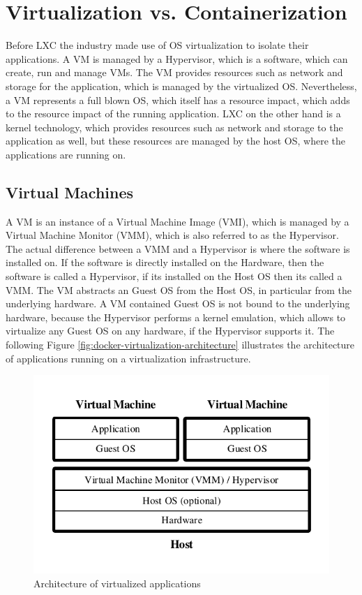 \section{Virtualization vs. Containerization}
\label{sec:docker-virtualization-vs-containerization}
Before LXC the industry made use of OS virtualization to isolate their applications. A VM is managed by a Hypervisor, which is a software, which can create, run and manage VMs. The VM provides resources such as network and storage for the application, which is managed by the virtualized OS. Nevertheless, a VM represents a full blown OS, which itself has a resource impact, which adds to the resource impact of the running application. LXC on the other hand is a kernel technology, which provides resources such as network and storage to the application as well, but these resources are managed by the host OS, where the applications are running on.

\subsection{Virtual Machines}
\label{sec:docker-virtual-machines}
A VM is an instance of a Virtual Machine Image (VMI), which is managed by a Virtual Machine Monitor (VMM), which is also referred to as the Hypervisor. The actual difference between a VMM and a Hypervisor is where the software is installed on. If the software is directly installed on the Hardware, then the software is called a Hypervisor, if its installed on the Host OS then its called a VMM. The VM abstracts  an Guest OS from the Host OS, in particular from the underlying hardware. A VM contained Guest OS is not bound to the underlying hardware, because the Hypervisor performs a kernel emulation, which allows to virtualize any Guest OS on any hardware, if the Hypervisor supports it. The following Figure \vref{fig:docker-virtualization-architecture} illustrates the architecture of applications running on a virtualization infrastructure.

\begin{figure}[htbp]
	\centering
	\includegraphics[scale=1]{images/docker-virtualization-architecture.pdf}
	\caption{Architecture of virtualized applications}
	\label{fig:docker-virtualization-architecture}
\end{figure} 

